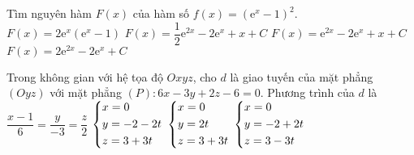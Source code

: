 \begin{ex}%
	Tìm nguyên hàm $F(x)$ của hàm số $f(x)={\left(\mathrm{e}^x - 1\right)}^2$. 
	\choice
	{$F(x)=2\mathrm{e}^x\left(\mathrm{e}^x - 1\right)$}
	{\True $F(x)=\dfrac{1}{2}\mathrm{e}^{2x} - 2\mathrm{e}^x + x + C$}
	{$F(x)=\mathrm{e}^{2x} - 2\mathrm{e}^x + x + C$}
	{$F(x)=2\mathrm{e}^{2x} - 2\mathrm{e}^x + C$}
\end{ex}

\begin{ex}%
	Trong không gian với hệ tọa độ $Oxyz$, cho $d$ là giao tuyến của mặt phẳng $\left(Oyz\right)$ với mặt phẳng $(P)\colon 6x - 3y + 2z - 6=0$. Phương trình của $d$ là 
	\choice
	{$\dfrac{x - 1}{6}=\dfrac{y}{- 3}=\dfrac{z}{2}$}
	{$\left\{\begin{aligned} & x=0 \\ & y= - 2 - 2t \\ & z=3 + 3t \end{aligned}\right. $}
	{\True $\left\{\begin{aligned} & x=0 \\ & y=2t \\ & z=3 + 3t \end{aligned}\right. $}
	{$\left\{\begin{aligned} & x=0 \\ & y= - 2 + 2t \\ & z=3 - 3t \end{aligned}\right. $}
\end{ex}


